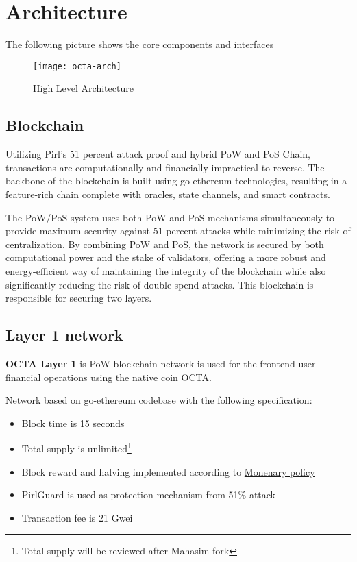 \section{Architecture}

The following picture shows the core components and interfaces

\begin{figure}[h]
    \centering
    \texttt{[image: octa-arch]}
    \caption{High Level Architecture}
\end{figure}

\subsection{Blockchain}

Utilizing Pirl's 51 percent attack proof and hybrid PoW and PoS Chain, transactions are computationally and financially impractical to reverse. The backbone of the blockchain is built using go-ethereum technologies, resulting in a feature-rich chain complete with oracles, state channels, and smart contracts.

The PoW/PoS system uses both PoW and PoS mechanisms simultaneously to provide maximum security against 51 percent attacks while minimizing the risk of centralization. By combining PoW and PoS, the network is secured by both computational power and the stake of validators, offering a more robust and energy-efficient way of maintaining the integrity of the blockchain while also significantly reducing the risk of double spend attacks. This blockchain is responsible for securing two layers.

\newpage

\subsection{Layer 1 network}

\textbf{OCTA Layer 1} is PoW\cite{pow} blockchain network is used for the frontend user financial operations using the native coin OCTA.

Network based on go-ethereum\cite{go-ethereum} codebase with the following specification:

\begin{itemize}
    \item Block time is 15 seconds
    \item Total supply is unlimited\footnote{Total supply will be reviewed after Mahasim fork}
    \item Block reward and halving implemented according to \hyperref[sec:mp]{Monenary policy}
    \item PirlGuard is used as protection mechanism from 51\% attack
    \item Transaction fee is 21 Gwei
\end{itemize}

